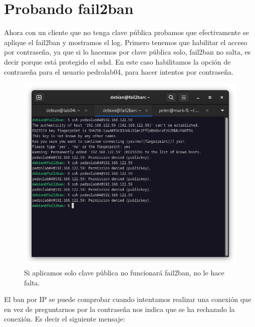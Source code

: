 \newpage
\section{Probando fail2ban}

Ahora con un cliente que no tenga clave pública probamos que efectivamente se aplique el fail2ban y mostramos el log. Primero tenemos que habilitar el acceso por contraseña, ya que si lo hacemos por clave pública solo, fail2ban no salta, es decir porque está protegido el sshd. En este caso habilitamos la opción de contraseña para el usuario pedrolab04, para hacer intentos por contraseña.

\begin{figure}[H]
	\centering
	\includegraphics[scale=0.40]{06}
	\caption{Si aplicamos solo clave pública no funcionará fail2ban, no le hace falta.}
\end{figure}

El ban por IP se puede comprobar cuando intentamos realizar una conexión que en vez de preguntarnos por la contraseña nos indica que se ha rechazado la conexión. Es decir el siguiente mensaje:
\vspace{5mm}

